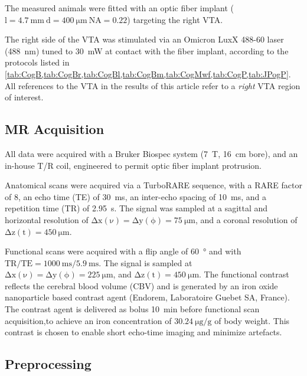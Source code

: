 The measured animals were fitted with an optic fiber implant ($\mathrm{l=\SI{4.7}{\milli\meter} \ d=\SI{400}{\micro\meter} \ NA=0.22}$) targeting the right VTA.

The right side of the VTA was stimulated via an Omicron LuxX 488-60 laser (\SI{488}{\nano\meter}) tuned to \SI{30}{\milli\watt} at contact with the fiber implant, according to the protocols listed in \cref{tab:CogB,tab:CogBr,tab:CogBl,tab:CogBm,tab:CogMwf,tab:CogP,tab:JPogP}.
All references to the VTA in the results of this article refer to a \textit{right} VTA region of interest.

\subsection{MR Acquisition}

All data were acquired with a Bruker Biospec system (\SI{7}{\tesla}, \SI{16}{\centi\meter} bore), and an in-house T/R coil, engineered to permit optic fiber implant protrusion.

Anatomical scans were acquired via a TurboRARE sequence, with a RARE factor of 8, an echo time (TE) of \SI{30}{\milli\second}, an inter-echo spacing of \SI{10}{\milli\second}, and a repetition time (TR) of \SI{2.95}{\second}.
The signal was sampled at a sagittal and horizontal resolution of $\mathrm{\Delta x(\nu)=\Delta y(\phi)=\SI{75}{\micro\meter}}$, and a coronal resolution of $\mathrm{\Delta z(t)=\SI{450}{\micro\meter}}$.

Functional scans were acquired with a flip angle of \SI{60}{\degree} and with $\mathrm{TR/TE = \SI{1000}{\milli\second}/\SI{5.9}{\milli\second}}$.
The signal is sampled at $\mathrm{\Delta x(\nu)=\Delta y(\phi)=\SI{225}{\micro\meter}}$, and $\mathrm{\Delta z(t)=\SI{450}{\micro\meter}}$.
The functional contrast reflects the cerebral blood volume (CBV) and is generated by an iron oxide nanoparticle based contrast agent (Endorem, Laboratoire Guebet SA, France).
The contrast agent is delivered as bolus \SI{10}{\minute} before functional scan acquisition,to achieve an iron concentration of $\SI{30.24}{\micro\gram\per\gram}$ of body weight.
This contrast is chosen to enable short echo-time imaging and minimize artefacts.

\subsection{Preprocessing}

